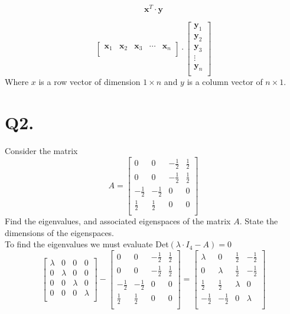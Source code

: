 \documentclass[12pt]{article}
\begin{document}
$$
\mathbf{x}^T\cdot \mathbf{y}
$$

$$
\begin{bmatrix}
	\mathbf{x}_1 & \mathbf{x}_2 & \mathbf{x}_3 & \cdots & \mathbf{x}_n \\
\end{bmatrix}
\cdot
\begin{bmatrix}
	\mathbf{y}_1 \\
	\mathbf{y}_2 \\
	\mathbf{y}_3 \\
	\vdots \\
	\mathbf{y}_n \\
\end{bmatrix}
$$
Where $x$ is a row vector of dimension $1 \times n$ and $y$ is a column vector of $n \times 1$.

\section*{Q2.}
Consider the matrix
$$
A = 
\begin{bmatrix}
	0 & 0 & -\frac{1}{2} & \frac{1}{2} \\
	0 & 0 & -\frac{1}{2} & \frac{1}{2} \\
	-\frac{1}{2} & -\frac{1}{2} & 0 & 0 \\
	\frac{1}{2} & \frac{1}{2} & 0 & 0 \\
\end{bmatrix}
$$
Find the eigenvalues, and associated eigenspaces of the matrix $A$. State the dimensions of the eigenspaces.\\
\medskip
To find the eigenvalues we must evaluate Det$(\lambda \cdot I_4-A)=0$
$$
\begin{bmatrix}
	\lambda & 0 & 0 & 0 \\
	0 & \lambda & 0 & 0 \\
	0 & 0 & \lambda & 0 \\
	0 & 0 & 0 & \lambda \\
\end{bmatrix}
-
\begin{bmatrix}
	0 & 0 & -\frac{1}{2} & \frac{1}{2} \\
	0 & 0 & -\frac{1}{2} & \frac{1}{2} \\
	-\frac{1}{2} & -\frac{1}{2} & 0 & 0 \\
	\frac{1}{2} & \frac{1}{2} & 0 & 0 \\
\end{bmatrix}
=
\begin{bmatrix}
	\lambda & 0 & \frac{1}{2} & -\frac{1}{2} \\
	0 & \lambda & \frac{1}{2} & -\frac{1}{2} \\
	\frac{1}{2} & \frac{1}{2} & \lambda & 0 \\
	-\frac{1}{2} & -\frac{1}{2} & 0 & \lambda \\
\end{bmatrix}
$$
\end{document}
